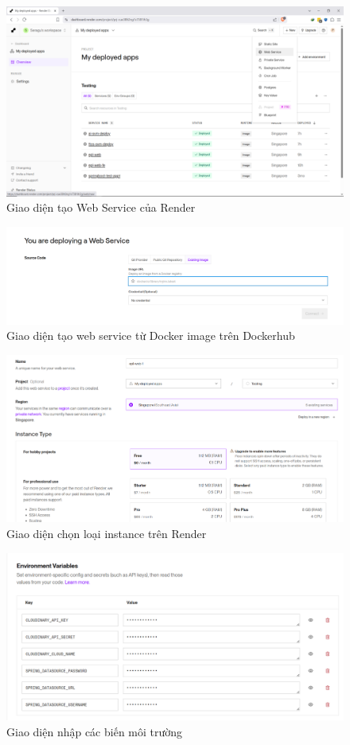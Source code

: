 \documentclass[../BTL.tex]{subfiles}
\begin{document}
\begin{figure}
    \centering
    \includegraphics[width=1\linewidth]{Hinhve/render-create-web-service.png}
    \caption{Giao diện tạo Web Service của Render}
    \label{fig:render-create-web-service}
\end{figure}
\begin{figure}
    \centering
    \includegraphics[width=1\linewidth]{Hinhve/render-web-service-existing-image.png}
    \caption{ Giao diện tạo web service từ Docker image trên Dockerhub}
    \label{fig:render-web-service-existing-imag}
\end{figure}
\begin{figure}
    \centering
    \includegraphics[width=1\linewidth]{Hinhve/render-choose-instance.png}
    \caption{Giao diện chọn loại instance trên Render}
    \label{fig:render-choose-instance}
\end{figure}
\begin{figure}
    \centering
    \includegraphics[width=1\linewidth]{Hinhve/render-environment-variable.png}
    \caption{Giao diện nhập các biến môi trường}
    \label{fig:render-environment-variable}
\end{figure}
\end{document}
